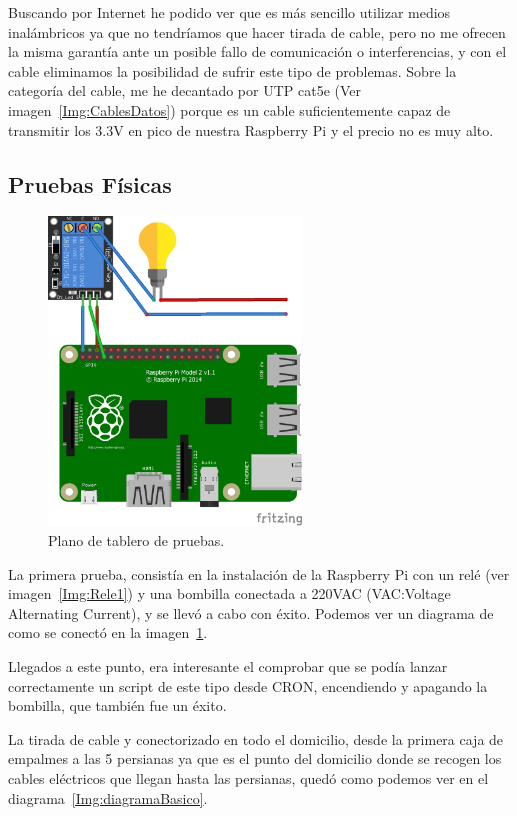 Buscando por Internet he podido ver que es más sencillo utilizar medios inalámbricos ya que no tendríamos que hacer tirada de cable, pero no me ofrecen la misma garantía ante un posible fallo de comunicación o interferencias, y con el cable eliminamos la posibilidad de sufrir este tipo de problemas. Sobre la categoría del cable, me he decantado por UTP cat5e (Ver imagen~\ref{Img:CablesDatos}) porque es un cable suficientemente capaz de transmitir los 3.3V en pico de nuestra Raspberry Pi y el precio no es muy alto.


\subsection{Pruebas Físicas}

\begin{figure}[h]
    \centering
    \includegraphics[width=0.6\textwidth]{img/Plano_Placa_Pruebas.png}
    \caption{Plano de tablero de pruebas.} \label{Img:Plano_Placa_Pruebas}
\end{figure}

La primera prueba, consistía en la instalación de la Raspberry Pi con un relé (ver imagen~\ref{Img:Rele1}) y una bombilla conectada a 220VAC (VAC:Voltage Alternating Current), y se llevó a cabo con éxito. Podemos ver un diagrama de como se conectó en la imagen~\ref{Img:Plano_Placa_Pruebas}.

Llegados a este punto, era interesante el comprobar que se podía lanzar correctamente un script de este tipo desde CRON, encendiendo y apagando la bombilla, que también fue un éxito.

La tirada de cable y conectorizado en todo el domicilio, desde la primera caja de empalmes a las 5 persianas ya que es el punto del domicilio donde se recogen los cables eléctricos que llegan hasta las persianas, quedó como podemos ver en el diagrama~\ref{Img:diagramaBasico}. 
